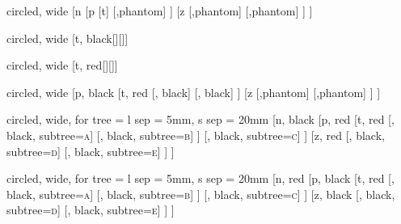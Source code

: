 


\begin{page}
	\begin{forest} circled, wide
		[n
			[p
				[t]
				[,phantom]
			]
			[z
				[,phantom]
				[,phantom]
			]
		]
	\end{forest}
\end{page}

\begin{page}
	\begin{forest} circled, wide
		[t, black[][]]
	\end{forest}
\end{page}

\begin{page}
	\begin{forest} circled, wide
		[t, red[][]]
	\end{forest}
\end{page}

\begin{page}
	\begin{forest} circled, wide
		[p, black
			[t, red
				[, black]
				[, black]
			]
			[z
				[,phantom]
				[,phantom]
			]
		]
	\end{forest}
\end{page}

\begin{page}
	\begin{forest}
		circled,
		wide,
		for tree = {%
			l sep = 5mm,
			s sep = 20mm
		}
		[n, black
			[p, red
				[t, red
					[, black, subtree={\textsc{a}}]
					[, black, subtree={\textsc{b}}]
				]
				[, black, subtree={\textsc{c}}]
			]
			[z, red
				[, black, subtree={\textsc{d}}]
				[, black, subtree={\textsc{e}}]
			]
		]
	\end{forest}
\end{page}

\begin{page}
	\begin{forest}
		circled,
		wide,
		for tree = {%
				l sep = 5mm,
				s sep = 20mm
		}
		[n, red
			[p, black
				[t, red
					[, black, subtree={\textsc{a}}]
					[, black, subtree={\textsc{b}}]
				]
				[, black, subtree={\textsc{c}}]
			]
			[z, black
				[, black, subtree={\textsc{d}}]
				[, black, subtree={\textsc{e}}]
			]
		]
	\end{forest}
\end{page}

